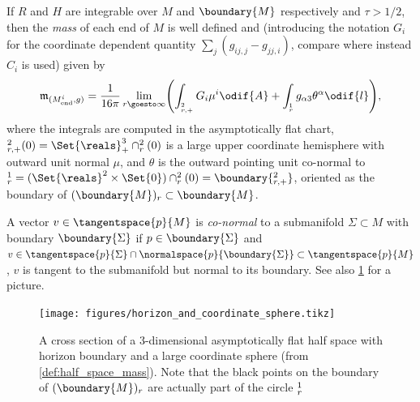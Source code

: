 \documentclass[titlepage,numbers=noenddot,headinclude,oneside,%
footinclude=true,cleardoublepage=empty,%
BCOR=5mm,paper=a4,fontsize=11pt,%
english,%
]{scrartcl}
\let\sphere\relax
\newcommand{\sphere}{\mathbb{S}}
\newcommand{\mass}[2]{\mathfrak{m}_{(#1,#2)}} %
\begin{document}
\begin{definition}\label{def:half_space_mass}
    If \( R \) and \( H \) are integrable over \( M \) and \( \boundary{M} \) respectively and \( \tau>1/2 \), then the \emph{mass} of each end of \( M \) is well defined and (introducing the notation \( G_i \) for the coordinate dependent quantity \( \sum_j (g_{ij,j}-g_{jj,i}) \), compare \cite[text]{almarazPositiveMassTheorem2016} where instead \( C_i \) is used) given by
    \begin{equation*}
        \mass{M_{\mathrm{end}}^i}{g}=\frac{1}{16\pi}\lim_{r \goesto \infty}\Biggl(\int_{\sphere_{r,+}^{2}}G_i\mu^i\odif{A}+\int_{\sphere_r^{1}}g_{\alpha 3}\theta^\alpha\odif{l}\Biggr),
    \end{equation*}
    where the integrals are computed in the asymptotically flat chart, \( \sphere_{r,+}^{2}(0)=\Set{\reals}^3_+\cap \sphere_r^2(0) \) is a large upper coordinate hemisphere with outward unit normal \( \mu \), and \( \theta \) is the outward pointing unit co-normal to \( \sphere_{r}^1=(\Set{\reals}^2\times \Set{0})\cap \sphere_r^2(0)=\boundary{\sphere_{r,+}^2} \), oriented as the boundary of \( (\boundary{M})_r\subset \boundary{M} \).
\end{definition}
\begin{remark}\label{def:co-normal_vector}
    A vector \( v\in \tangentspace{p}{M} \) is \emph{co-normal} to a submanifold \( \Sigma\subset M \) with boundary \( \boundary{\Sigma} \) if \( p\in \boundary{\Sigma} \) and \( v\in \tangentspace{p}{\Sigma}\cap \normalspace{p}{\boundary{\Sigma}}\subset \tangentspace{p}{M} \), \ie \( v \) is tangent to the submanifold but normal to its boundary. See also \cref{fig:horizon_and_coordinate_sphere} for a picture.
\end{remark}
\begin{figure}[H]
    \centering
    \texttt{[image: figures/horizon\_and\_coordinate\_sphere.tikz]}
    \caption{A cross section of a 3-dimensional asymptotically flat half space with horizon boundary and a large coordinate sphere (from \cref{def:half_space_mass}). Note that the black points on the boundary of \( (\boundary{M})_r \) are actually part of the circle \( \sphere^1_r \)}
    \label{fig:horizon_and_coordinate_sphere}
\end{figure}
\end{document}
